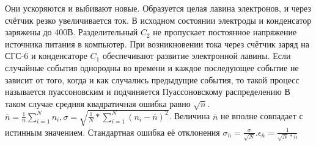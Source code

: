 \documentclass[12pt, a4paper]{article}
\begin{document}
        \noindent\begin{minipage}[c]{0.67\textwidth}
            \hspace{1cm}Они ускоряются и выбивают новые. Образуется целая лавина электронов, и через счётчик резко увеличивается ток.
            В исходном состоянии электроды и конденсатор заряжены до 400В. Разделительный $C_2$ не пропускает постоянное напряжение источника питания в компьютер.
            При возникновении тока через счётчик заряд на СГС-6 и конденсаторе $C_1$ обеспечивают развитие электронной лавины.
            Если случайные события однородны во времени и каждое последующее событие не зависит от того, когда и как случались предыдущие события, то такой процесс называется пуассоновским и подчиняется Пуассоновскому распределению
            В таком случае средняя квадратичная ошибка равно $\sqrt{\overline{n} }$. \\
            $\overline{n} = \frac{1}{n} \sum_{i = 1}^{N}{n_i}, \sigma = \sqrt{\frac{1}{N} * \sum_{i = 1}^{N}{(n_i - \overline{n})}^2}$. 
            Величина $\overline{n}$ не вполне совпадает с истинным значением. Стандартная ошибка её отклонения
            $\sigma_{\overline{n}} = \frac{\sigma}{\sqrt{N}}. \epsilon_{\overline{n}} = \frac{1}{\sqrt{N} * \overline{n}}$
        \end{minipage}
\end{document}
